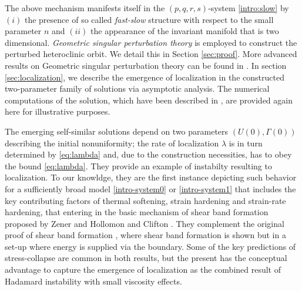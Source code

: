 \documentclass[a4paper,11pt]{article}
\theoremstyle{remark}
\begin{document}
The above mechanism manifests itself in the $(p,q,r,s)$-system \eqref{intro:slow} by $(i)$ the presence of so called {\it fast-slow} structure with respect to the small parameter $n$ and $(ii)$ the appearance of the invariant manifold that is two dimensional. {\it Geometric singular perturbation theory} is employed 
to construct the perturbed heteroclinic orbit. We detail this in Section \ref{sec:proof}. More advanced results on Geometric singular perturbation theory can be found in \cite{fenichel_asymptotic_1974, fenichel_asymptotic_1977,fenichel_geometric_1979,HPS_1977,Sz1991,wiggins_normally_1994,Jones_1995,KUEHN_2015}.
In section \ref{sec:localization}, we describe the emergence of localization in the constructed two-parameter family of solutions via asymptotic analysis. The numerical computations of the solution, which have been described in \cite{KLT_HYP2016}, are provided again here for illustrative purposes. 

The emerging self-similar solutions depend on two parameters $(U(0), \Gamma (0))$ describing the initial nonuniformity; the rate of localization $\lambda$ is 
in turn determined by \eqref{eq:lambda} and, due to the construction necessities, has to obey the bound \eqref{eq:lambda}.
They provide an example of instabilty resulting to localization. To our knowldge, they are the first instance depicting such behavior for
a sufficiently broad model \eqref{intro-system0} or \eqref{intro-system1} that includes the key contributing factors 
of thermal softening, strain hardening and strain-rate hardening, that entering in the 
basic mechanism of shear band formation proposed by Zener and Hollomon \cite{zener_effect_1944} and Clifton \cite{clifton_rev_1990}. 
They complement the original proof of shear band formation \cite{Tz_1987}, where shear band formation is shown but in a set-up where energy is supplied via the boundary. 
Some of the key predictions of stress-collapse are common in both results, but the present has the conceptual 
advantage to capture the emergence of localization as the combined result
of Hadamard instability with small viscosity effects.

\end{document}
